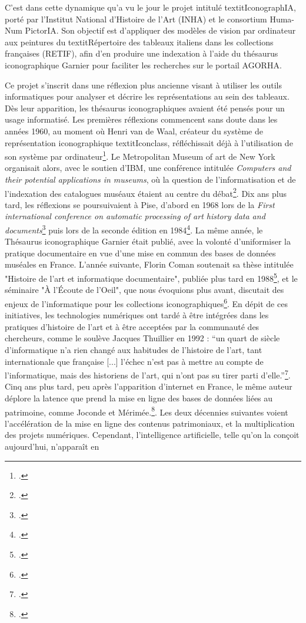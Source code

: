 C’est dans cette dynamique qu’a vu le jour le projet intitulé textit{IconographIA}, porté par l’Institut National d’Histoire de l’Art (INHA) et le consortium Huma-Num PictorIA. Son objectif est d’appliquer des modèles de vision par ordinateur aux peintures du textit{Répertoire des tableaux italiens dans les collections françaises} (RETIF), afin d’en produire une indexation à l’aide du thésaurus iconographique Garnier pour faciliter les recherches sur le portail AGORHA.

Ce projet s’inscrit dans une réflexion plus ancienne visant à utiliser les outils informatiques pour analyser et décrire les représentations au sein des tableaux. Dès leur apparition, les thésaurus iconographiques avaient été pensés pour un usage informatisé. Les premières réflexions commencent sans doute dans les années 1960, au moment où Henri van de Waal, créateur du système de représentation iconographique textit{Iconclass}, réfléchissait déjà à l'utilisation de son système par ordinateur\footcite{vandewaalSystemeClassificationIconographique1969}. Le Metropolitan Museum of art de New York organisait alors, avec le soutien d’IBM, une conférence intitulée \textit{Computers and their potential applications in museums}, où la question de l’informatisation et de l’indexation des catalogues muséaux étaient au centre du débat\footcite{metropolitanmuseumofartComputersTheirPotential1968}. Dix ans plus tard, les réflexions se poursuivaient à Pise, d’abord en 1968 lors de la \textit{First international conference on automatic processing of art history data and documents}\footcite{barocchiFirstInternationalConference1978} puis lors de la seconde édition en 1984\footcite{cortiAutomaticProcessingArt1984}. La même année, le Thésaurus iconographique Garnier était publié, avec la volonté d’uniformiser la pratique documentaire en vue d’une mise en commun des bases de données muséales en France. L’année suivante, Florin Coman soutenait sa thèse intitulée "Histoire de l'art et informatique documentaire", publiée plus tard en 1988\footcite{comanLhistoireLartLinformatique1988}, et le séminaire "À l'Écoute de l'Oeil", que nous évoquions plus avant, discutait des enjeux de l'informatique pour les collections iconographiques\footcite{rouitLecouteLoeilCollections1989}. En dépit de ces initiatives, les technologies numériques ont tardé à être intégrées dans les pratiques d’histoire de l’art et à être acceptées par la communauté des chercheurs, comme le soulève Jacques Thuillier en 1992 : “un quart de siècle d’informatique n’a rien changé aux habitudes de l’histoire de l’art, tant internationale que française [...] l’échec n’est pas à mettre au compte de l’informatique, mais des historiens de l’art, qui n’ont pas su tirer parti d’elle.”\footcite[p. 5]{thuillierLinformatiqueHistoireLart1992}. Cinq ans plus tard, peu après l’apparition d’internet en France, le même auteur déplore la latence que prend la mise en ligne des bases de données liées au patrimoine, comme Joconde et Mérimée.\footcite[p. 8]{thuillierLinformatiqueLhistoireLart1997}. Les deux décennies suivantes voient l’accélération de la mise en ligne des contenus patrimoniaux, et la multiplication des projets numériques. Cependant, l’intelligence artificielle, telle qu’on la conçoit aujourd’hui, n’apparaît en 